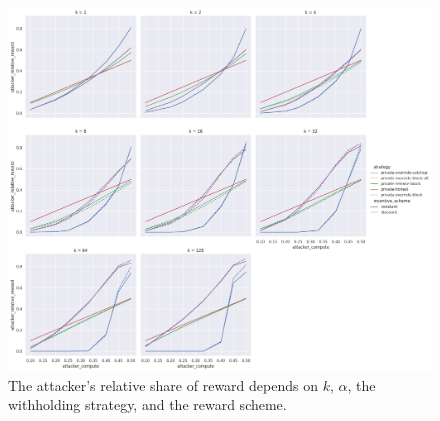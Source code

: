 \documentclass{article}
\begin{document}
\begin{figure}
  \includegraphics[width=\linewidth]{fig/withholding_relative}
  \caption{
    The attacker's relative share of reward depends on $k$, $\alpha$, the withholding strategy, and the reward scheme.
  }
  \label{fig:withholding_relative}
\end{figure}
\end{document}
